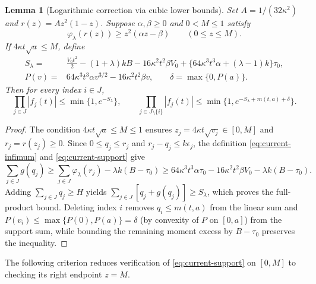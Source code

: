 \documentclass[11pt]{article}
\numberwithin{equation}{section}
\newtheorem{lemma}[theorem]{Lemma}
\theoremstyle{remark}
\begin{document}
\begin{lemma}[Logarithmic correction via cubic lower bounds]\label{lem:current-log-support}
Set $A=1/(32\kappa^2)$ and $r(z)=Az^2(1-z)$. Suppose $\alpha,\beta\ge0$ and
$0<M\le1$ satisfy
\begin{equation}\label{eq:current-support}
 \varphi_\lambda(r(z))\ge z^2(\alpha z-\beta)
 \qquad(0\le z\le M).
\end{equation}
If $4\kappa t\sqrt a\le M$, define
\begin{align}
 S_\lambda={}&\frac{V_0t^2}{2}-(1+\lambda)kB
           -16\kappa^2t^2\beta V_0
           +\{64\kappa^3t^3\alpha+(\lambda-1)k\}\tau_0,
             \label{eq:current-full-log}\\
 P(v)={}&64\kappa^3t^3\alpha v^{3/2}-16\kappa^2t^2\beta v,
 \qquad \delta=\max\{0,P(a)\}.
             \label{eq:current-log-loss}
\end{align}
Then for every index $i\in J$,
\[
 \prod_{j\in J}|f_j(t)|\le\min\{1,e^{-S_\lambda}\},\qquad
 \prod_{j\in J\setminus\{i\}}|f_j(t)|
       \le\min\{1,e^{-S_\lambda+m(t,a)+\delta}\}.
\]
\end{lemma}
\begin{proof}
The condition $4\kappa t\sqrt a\le M\le1$ ensures $z_j=4\kappa t\sqrt{v_j}\in[0,M]$
and $r_j=r(z_j)\ge0$. Since $0\le q_j\le r_j$ and $r_j-q_j\le k\epsilon_j$,
the definition \eqref{eq:current-infimum} and \eqref{eq:current-support} give
\[
 \sum_{j\in J}g(q_j)
 \ge\sum_{j\in J}\varphi_\lambda(r_j)-\lambda k(B-\tau_0)
 \ge64\kappa^3t^3\alpha\tau_0-16\kappa^2t^2\beta V_0-\lambda k(B-\tau_0).
\]
Adding $\sum_{j\in J}q_j\ge H$ yields $\sum_{j\in J}[q_j+g(q_j)]\ge S_\lambda$,
which proves the full-product bound. Deleting index $i$ removes $q_i\le m(t,a)$
from the linear sum and $P(v_i)\le\max\{P(0),P(a)\}=\delta$ (by convexity of
$P$ on $[0,a]$) from the support sum, while bounding the remaining moment
excess by $B-\tau_0$ preserves the inequality.
\end{proof}

The following criterion reduces verification of \eqref{eq:current-support}
on $[0,M]$ to checking its right endpoint $z=M$.
\end{document}

